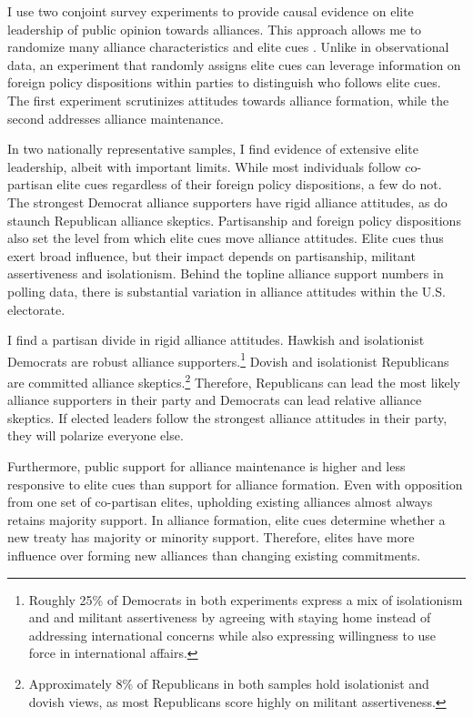 \documentclass[12pt]{article}
\begin{document}
I use two conjoint survey experiments to provide causal evidence on elite leadership of public opinion towards alliances.
This approach allows me to randomize many alliance characteristics and elite cues \citep{Hainmuelleretal2014}.
Unlike in observational data, an experiment that randomly assigns elite cues can leverage information on foreign policy dispositions within parties to distinguish who follows elite cues. 
The first experiment scrutinizes attitudes towards alliance formation, while the second addresses alliance maintenance. 


In two nationally representative samples, I find evidence of extensive elite leadership, albeit with important limits.
While most individuals follow co-partisan elite cues regardless of their foreign policy dispositions, a few do not.
The strongest Democrat alliance supporters have rigid alliance attitudes, as do staunch Republican alliance skeptics. 
Partisanship and foreign policy dispositions also set the level from which elite cues move alliance attitudes.
Elite cues thus exert broad influence, but their impact depends on partisanship, militant assertiveness and isolationism.
Behind the topline alliance support numbers in polling data, there is substantial variation in alliance attitudes within the U.S. electorate.


I find a partisan divide in rigid alliance attitudes.
Hawkish and isolationist Democrats are robust alliance supporters.\footnote{Roughly 25\% of Democrats in both experiments express a mix of isolationism and and militant assertiveness by agreeing with staying home instead of addressing international concerns while also expressing willingness to use force in international affairs.}
Dovish and isolationist Republicans are committed alliance skeptics.\footnote{Approximately 8\% of Republicans in both samples hold isolationist and dovish views, as most Republicans score highly on militant assertiveness.} 
Therefore, Republicans can lead the most likely alliance supporters in their party and Democrats can lead relative alliance skeptics. 
If elected leaders follow the strongest alliance attitudes in their party, they will polarize everyone else. 


Furthermore, public support for alliance maintenance is higher and less responsive to elite cues than support for alliance formation.
Even with opposition from one set of co-partisan elites, upholding existing alliances almost always retains majority support. 
In alliance formation, elite cues determine whether a new treaty has majority or minority support. 
Therefore, elites have more influence over forming new alliances than changing existing commitments. 
\end{document}
